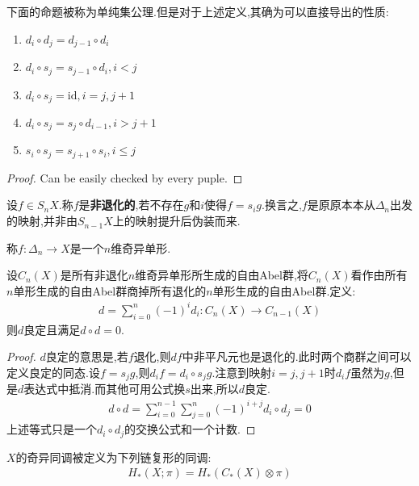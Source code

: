 \begin{proposition}\label{pro:1}
    下面的命题被称为单纯集公理.但是对于上述定义,其确为可以直接导出的性质:
    \begin{enumerate}
        \item $d_i \circ d_j=d_{j-1}\circ d_i$
        \item $d_i \circ s_j= s_{j-1}\circ d_i ,i<j$
        \item $d_i \circ s_j=\mathrm{id},i=j,j+1$
        \item $d_i \circ s_j=s_j \circ d_{i-1},i>j+1$
        \item $s_i\circ s_j=s_{j+1}\circ s_i,i\leq j$
    \end{enumerate}
\end{proposition}
\begin{proof}
    Can be easily checked by every puple. 
\end{proof}
\begin{definition}
    设$f \in S_nX$.称$f$是\textbf{非退化的},若不存在$g$和$i$使得$f=s_ig$.换言之,$f$是原原本本从$\Delta_n$出发的映射,并非由$S_{n-1}X$上的映射提升后伪装而来.

    称$f:\Delta_n \to X$是一个$n$维奇异单形.
\end{definition}
\begin{proposition}
    设$C_n(X)$是所有非退化$n$维奇异单形所生成的自由Abel群,将$C_n(X)$看作由所有$n$单形生成的自由Abel群商掉所有退化的$n$单形生成的自由Abel群.定义:
    \begin{align*}
        d=\sum_{i=0}^n(-1)^i d_i:C_n(X)\to C_{n-1}(X)
    \end{align*}
    则$d$良定且满足$d \circ d=0$.
\end{proposition}
\begin{proof}
    $d$良定的意思是,若$f$退化,则$df$中非平凡元也是退化的.此时两个商群之间可以定义良定的同态.设$f=s_jg$,则$d_if=d_i \circ s_j g$.注意到映射$i=j,j+1$时$d_if$虽然为$g$,但是$d$表达式中抵消.而其他可用公式换$s$出来,所以$d$良定.
    \begin{align*}
        d\circ d=\sum_{i=0}^{n-1}\sum_{j=0}^n (-1)^{i+j}d_i \circ d_j=0
    \end{align*}
    上述等式只是一个$d_i \circ d_j$的交换公式和一个计数.
\end{proof}
\begin{definition}[奇异同调]
    $X$的奇异同调被定义为下列链复形的同调:
    \begin{align*}
        H_*(X;\pi)=H_*(C_*(X)\otimes \pi)
    \end{align*}
\end{definition}
